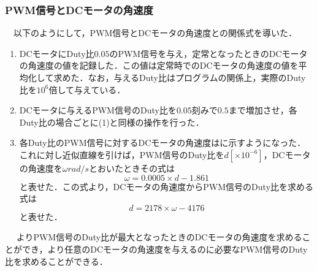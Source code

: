 \subsubsection{PWM信号とDCモータの角速度}
　以下のようにして，PWM信号とDCモータの角速度との関係式を導いた．
\begin{enumerate}
\item DCモータにDuty比$0.05$のPWM信号を与え，定常となったときのDCモータの角速度の値を記録した．この値は定常時でのDCモータの角速度の値を平均化して求めた．なお，与えるDuty比はプログラムの関係上，実際のDuty比を$10^{6}$倍して与えている．
\item DCモータに与えるPWM信号のDuty比を$0.05$刻みで$0.5$まで増加させ，各Duty比の場合ごとに(1)と同様の操作を行った．
\item 各Duty比のPWM信号に対するDCモータの角速度はに示すようになった．これに対し近似直線を引けば，PWM信号のDuty比を$d[\times 10^{-6}]$，DCモータの角速度を$\omega\unit{rad/s}$とおいたときその式は
\begin{equation}
\omega=0.0005\times d-1.861 \label{eq::omega_pulse}
\end{equation}
と表せた．この式より，DCモータの角速度からPWM信号のDuty比を求める式は
\begin{equation}
d=2178\times\omega-4176 \label{eq::pulse_omega}
\end{equation}
と表せた．
\end{enumerate}　
よりPWM信号のDuty比が最大となったときのDCモータの角速度を求めることができ，より任意のDCモータの角速度を与えるのに必要なPWM信号のDuty比を求めることができる．
